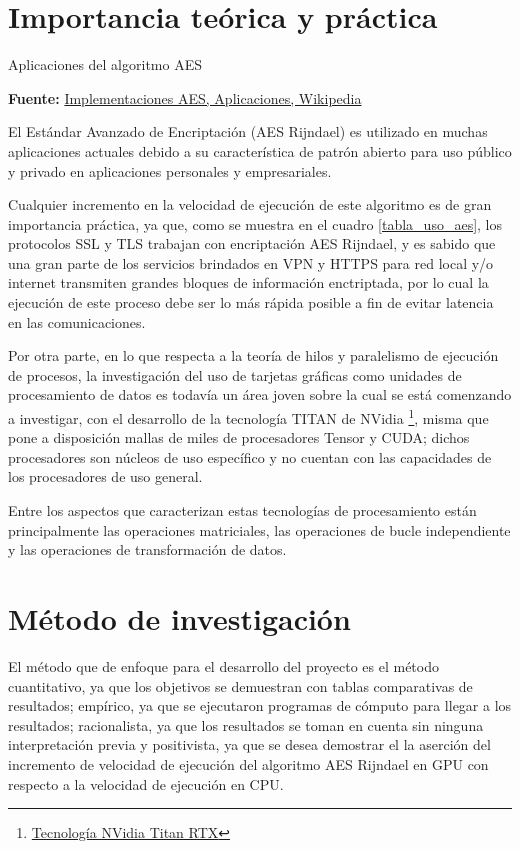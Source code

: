 \documentclass[../main/main.tex]{subfiles}
\begin{document}
  \section{Importancia teórica y práctica}

  \begin{table}[H]
    \centering
    \caption{Aplicaciones del algoritmo AES}
    
    \caption*{\textbf{Fuente:} \href{https://en.wikipedia.org/wiki/AES_implementations}{Implementaciones AES, Aplicaciones, Wikipedia}}
    \label{tabla_uso_aes}
  \end{table}

  El Estándar Avanzado de Encriptación (AES Rijndael) es utilizado en muchas aplicaciones actuales debido a su característica de patrón abierto para uso público y privado en aplicaciones personales y empresariales.

  Cualquier incremento en la velocidad de ejecución de este algoritmo es de gran importancia práctica, ya que, como se muestra en el cuadro \ref{tabla_uso_aes}, los protocolos SSL y TLS trabajan con encriptación AES Rijndael, y es sabido que una gran parte de los servicios brindados en VPN y HTTPS para red local y/o internet transmiten grandes bloques de información enctriptada, por lo cual la ejecución de este proceso debe ser lo más rápida posible a fin de evitar latencia en las comunicaciones.

  Por otra parte, en lo que respecta a la teoría de hilos y paralelismo de ejecución de procesos, la investigación del uso de tarjetas gráficas como unidades de procesamiento de datos es todavía un área joven sobre la cual se está comenzando a investigar, con el desarrollo de la tecnología TITAN de NVidia \footnote{\href{https://www.nvidia.com/en-us/titan/titan-rtx/}{Tecnología NVidia Titan RTX}}, misma que pone a disposición mallas de miles de procesadores Tensor y CUDA; dichos procesadores son núcleos de uso específico y no cuentan con las capacidades de los procesadores de uso general.

  Entre los aspectos que caracterizan estas tecnologías de procesamiento están principalmente las operaciones matriciales, las operaciones de bucle independiente y las operaciones de transformación de datos.

  \section{Método de investigación}

  El método que de enfoque para el desarrollo del proyecto es el método cuantitativo, ya que los objetivos se demuestran con tablas comparativas de resultados; empírico, ya que se ejecutaron programas de cómputo para llegar a los resultados; racionalista, ya que los resultados se toman en cuenta sin ninguna interpretación previa y positivista, ya que se desea demostrar el la aserción del incremento de velocidad de ejecución del algoritmo AES Rijndael en GPU con respecto a la velocidad de ejecución en CPU.
\end{document}
